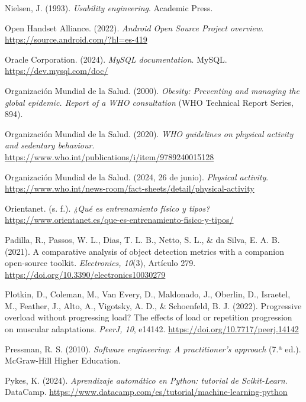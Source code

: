\begin{referenciasapa}
\item Nielsen, J. (1993). \textit{Usability engineering}. Academic Press.

\item Open Handset Alliance. (2022). \textit{Android Open Source Project overview}. \url{https://source.android.com/?hl=es-419}

\item Oracle Corporation. (2024). \textit{MySQL documentation}. MySQL. \url{https://dev.mysql.com/doc/}

\item Organización Mundial de la Salud. (2000). \textit{Obesity: Preventing and managing the global epidemic. Report of a WHO consultation} (WHO Technical Report Series, 894).

\item Organización Mundial de la Salud. (2020). \textit{WHO guidelines on physical activity and sedentary behaviour}. \url{https://www.who.int/publications/i/item/9789240015128}

\item Organización Mundial de la Salud. (2024, 26 de junio).
    \textit{Physical activity}.
    \url{https://www.who.int/news-room/fact-sheets/detail/physical-activity}

\item Orientanet. (s. f.). \textit{¿Qué es entrenamiento físico y tipos?} \url{https://www.orientanet.es/que-es-entrenamiento-fisico-y-tipos/}

\item Padilla, R., Passos, W. L., Dias, T. L. B., Netto, S. L., \& da Silva, E. A. B. (2021). A comparative analysis of object detection metrics with a companion open-source toolkit. \textit{Electronics, 10}(3), Artículo 279. \url{https://doi.org/10.3390/electronics10030279}

\item Plotkin, D., Coleman, M., Van Every, D., Maldonado, J., Oberlin, D., Israetel, M., Feather, J., Alto, A., Vigotsky, A. D., \& Schoenfeld, B. J. (2022). Progressive overload without progressing load? The effects of load or repetition progression on muscular adaptations. \textit{PeerJ, 10}, e14142. \url{https://doi.org/10.7717/peerj.14142}

\item Pressman, R. S. (2010). \textit{Software engineering: A practitioner's approach} (7.ª ed.). McGraw-Hill Higher Education.

\item Pykes, K. (2024). \textit{Aprendizaje automático en Python: tutorial de Scikit-Learn}. DataCamp. \url{https://www.datacamp.com/es/tutorial/machine-learning-python}


\end{referenciasapa}
